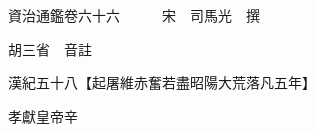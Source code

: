 










 


 
 


 

  
  
  
  
  





  
  
  
  
  
 
  

  

  
  
  



  

 
 

  
   




  

  
  


  　　資治通鑑卷六十六　　　宋　司馬光　撰

　　胡三省　音註

　　漢紀五十八【起屠維赤奮若盡昭陽大荒落凡五年】

　　孝獻皇帝辛

